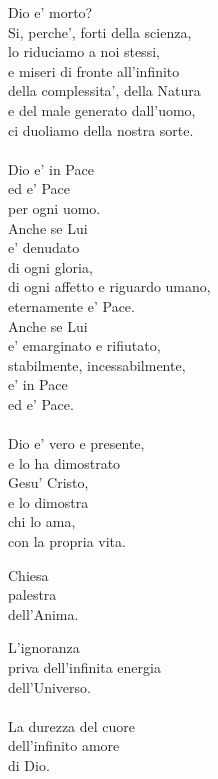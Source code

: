 \begin{haiku}
    Dio e' morto?\\
    Si, perche', forti della scienza,\\
    lo riduciamo a noi stessi,\\
    e miseri di fronte all'infinito\\
    della complessita', della Natura\\
    e del male generato dall'uomo,\\
    ci duoliamo della nostra sorte.\\
    \leavevmode\\
    Dio e' in Pace\\
    ed e' Pace\\
    per ogni uomo.\\
    Anche se Lui\\
    e' denudato\\
    di ogni gloria,\\
    di ogni affetto e riguardo umano,\\
    eternamente e' Pace.\\
    Anche se Lui\\
    e' emarginato e rifiutato,\\
    stabilmente, incessabilmente,\\
    e' in Pace\\
    ed e' Pace.\\
    \leavevmode\\
    Dio e' vero e presente,\\
    e lo ha dimostrato\\
    Gesu' Cristo,\\
    e lo dimostra\\
    chi lo ama,\\
    con la propria vita.\\
\end{haiku}

\begin{haiku}
    Chiesa\\
    palestra\\
    dell'Anima.\\
\end{haiku}

\begin{haiku}
    L'ignoranza\\
    priva dell'infinita energia\\
    dell'Universo.\\
    \leavevmode\\
    La durezza del cuore\\
    dell'infinito amore\\
    di Dio.\\
\end{haiku}

